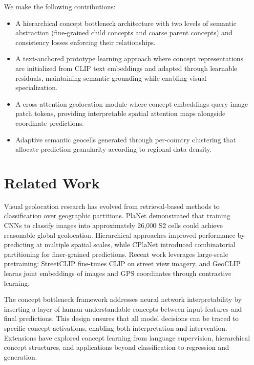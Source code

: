 \documentclass{uva-inf-article}
\begin{document}
We make the following contributions:
\begin{itemize}
    \item A hierarchical concept bottleneck architecture with two levels of semantic abstraction (fine-grained child concepts and coarse parent concepts) and consistency losses enforcing their relationships.
    
    \item A text-anchored prototype learning approach where concept representations are initialized from CLIP text embeddings and adapted through learnable residuals, maintaining semantic grounding while enabling visual specialization.
    
    \item A cross-attention geolocation module where concept embeddings query image patch tokens, providing interpretable spatial attention maps alongside coordinate predictions.
    
    \item Adaptive semantic geocells generated through per-country clustering that allocate prediction granularity according to regional data density.
\end{itemize}


\section{Related Work}
\label{sec:related}

Visual geolocation research has evolved from retrieval-based methods \parencite{hays2008im2gps} to classification over geographic partitions. PlaNet \parencite{weyand2016planet} demonstrated that training CNNs to classify images into approximately 26,000 S2 cells could achieve reasonable global geolocation. Hierarchical approaches \parencite{muller2018geolocation} improved performance by predicting at multiple spatial scales, while CPlaNet \parencite{seo2018cpl} introduced combinatorial partitioning for finer-grained predictions. Recent work leverages large-scale pretraining: StreetCLIP \parencite{streetclip2023} fine-tunes CLIP on street view imagery, and GeoCLIP \parencite{cepeda2023geoclip} learns joint embeddings of images and GPS coordinates through contrastive learning.

The concept bottleneck framework \parencite{koh2020concept} addresses neural network interpretability by inserting a layer of human-understandable concepts between input features and final predictions. This design ensures that all model decisions can be traced to specific concept activations, enabling both interpretation and intervention. Extensions have explored concept learning from language supervision, hierarchical concept structures, and applications beyond classification to regression and generation.
\end{document}
